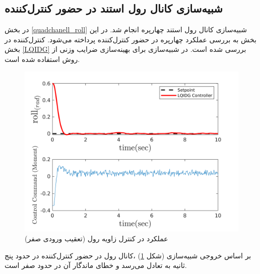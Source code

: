 \subsection{شبیه‌سازی کانال رول استند در حضور کنترل‌کننده }\label{roll_lqidg_section_simulation}
در بخش
\ref{quadchanell_roll}
شبیه‌سازی کانال رول استند چهارپره انجام شد. در این بخش به بررسی عملکرد چهارپره در حضور کنترل‌کننده  پرداخته می‌شود. کنترل‌کننده  در بخش
\ref{LQIDG}
بررسی شده است.
 در شبیه‌سازی برای بهینه‌سازی ضرایب وزنی  از روش
 \cite{Karimi2010}
استفاده شده است.
\begin{figure}[H]
	\includegraphics[width=12cm]{../Figures/MIL/LQIDG/Roll/lqidg_roll.png}
	\centering
	\caption{عملكرد  در کنترل زاويه رول (تعقیب ورودی صفر)}
	\label{lqidg_roll_fig_simulation}
\end{figure}
بر اساس خروجی شبیه‌سازی (شکل
\ref{lqidg_roll_fig_simulation})
،کانال رول در حضور کنترل‌کننده  در حدود پنج ثانیه به تعادل می‌رسد و خطای ماندگار آن در حدود صفر است.